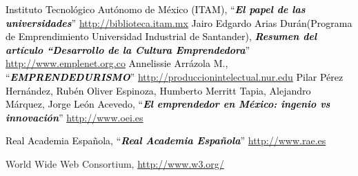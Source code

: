 \documentclass[11pt,letterpaper,titlepage]{article}
\begin{document}
\begin{thebibliography}{99}
 \textcolor{black}{Instituto Tecnol\'ogico Aut\'onomo de M\'exico (ITAM), ``\textbf{\textit{El papel de las universidades}}'' \href{http://biblioteca.itam.mx/estudios/estudio/letras39-40/texto10/sec\_2.html}{http://biblioteca.itam.mx} } 
 \textcolor{black}{Jairo Edgardo Arias Dur\'an(Programa de Emprendimiento Universidad Industrial de Santander), \textbf{\textit{Resumen del art\'iculo ``Desarrollo de la Cultura Emprendedora}}'' \\\href{http://www.emplenet.org.co/roce/documentos/desarrollo\%20de\%20la\%20cultura\%20emprendedora.pdf}{http://www.emplenet.org.co}}
 \textcolor{black}{Annelissie Arr\'azola M., ``\textbf{\textit{EMPRENDEDURISMO}}'' \href{http://produccionintelectual.nur.edu/archivos/emprendedurismo.pdf}{http://produccionintelectual.nur.edu}}
 \textcolor{black}{Pilar P\'erez Hern\'andez, Rub\'en Oliver Espinoza, Humberto Merritt Tapia, Alejandro M\'arquez, Jorge Le\'on Acevedo, ``\textbf{\textit{El emprendedor en M\'exico: ingenio vs innovaci\'on}}'' \href{http://www.oei.es/memoriasctsi/mesa12/m12p25.pdf}{http://www.oei.es} }

 \textcolor{black}{Real Academia Espa\~nola, ``\textbf{\textit{Real Academia Espa\~nola}}'' \href{http://www.rae.es}{http://www.rae.es}}

 World Wide Web Consortium, \href{http://www.w3.org/}{http://www.w3.org/}

\end{thebibliography}
\end{document}
